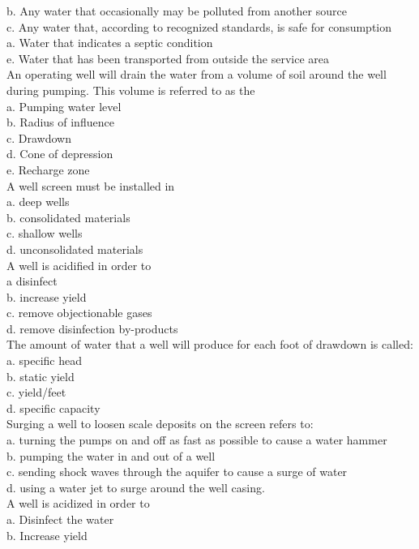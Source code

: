 b. Any water that occasionally may be polluted from another source\\
c. Any water that, according to recognized standards, is safe for consumption\\
a. Water that indicates a septic condition\\
e. Water that has been transported from outside the service area\\
An operating well will drain the water from a volume of soil around the well during pumping. This volume is referred to as the\\
a.	Pumping water level\\
b.	Radius of influence\\
c.	Drawdown\\
d. Cone of depression\\
e.	Recharge zone\\
A well screen must be installed in\\
a.	deep wells\\
b.	consolidated materials\\
c.	shallow wells\\
d.	unconsolidated materials\\
A well is acidified in order to\\
a	disinfect\\
b.	increase yield\\
c.	remove objectionable gases\\
d.	 remove disinfection by-products\\
The amount of water that a well will produce for each foot of drawdown is called:\\
a.	specific head\\
b.	static yield\\
c.	yield/feet\\
d.	specific capacity\\
Surging a well to loosen scale deposits on the screen refers to:\\
a.	turning the pumps on and off as fast as possible to cause a water hammer\\
b.	pumping the water in and out of a well\\
c.	sending shock waves through the aquifer to cause a surge of water\\
d.	using a water jet to surge around the well casing.\\
A well is acidized in order to\\
a. Disinfect the water\\
b. Increase yield\\
